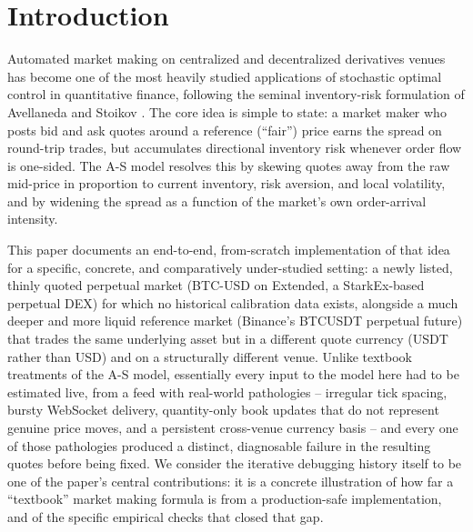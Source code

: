 \documentclass[11pt,a4paper]{article}
\begin{document}
\section{Introduction}

Automated market making on centralized and decentralized derivatives venues has become one of
the most heavily studied applications of stochastic optimal control in quantitative finance,
following the seminal inventory-risk formulation of Avellaneda and Stoikov
\cite{avellaneda2008}. The core idea is simple to state: a market maker who posts bid and ask
quotes around a reference (``fair'') price earns the spread on round-trip trades, but accumulates
directional inventory risk whenever order flow is one-sided. The A-S model resolves this by
skewing quotes away from the raw mid-price in proportion to current inventory, risk aversion, and
local volatility, and by widening the spread as a function of the market's own order-arrival
intensity.

This paper documents an end-to-end, from-scratch implementation of that idea for a specific,
concrete, and comparatively under-studied setting: a newly listed, thinly quoted perpetual
market (BTC-USD on Extended, a StarkEx-based perpetual DEX) for which no historical calibration
data exists, alongside a much deeper and more liquid reference market (Binance's BTCUSDT
perpetual future) that trades the same underlying asset but in a different quote currency
(USDT rather than USD) and on a structurally different venue. Unlike textbook treatments of the
A-S model, essentially every input to the model here had to be estimated live, from a feed with
real-world pathologies -- irregular tick spacing, bursty WebSocket delivery, quantity-only book
updates that do not represent genuine price moves, and a persistent cross-venue currency basis --
and every one of those pathologies produced a distinct, diagnosable failure in the resulting
quotes before being fixed. We consider the iterative debugging history itself to be one of the
paper's central contributions: it is a concrete illustration of how far a ``textbook'' market
making formula is from a production-safe implementation, and of the specific empirical checks
that closed that gap.
\end{document}
